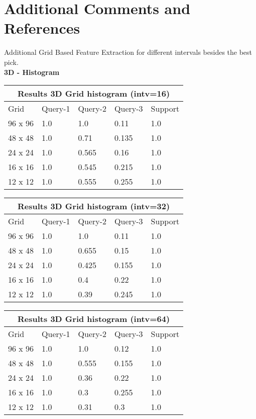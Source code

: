 \documentclass[12pt]{article}
\begin{document}
\section{Additional Comments and References}

Additional Grid Based Feature Extraction for different intervals besides the best pick. \\



\textbf{3D - Histogram} \\ 

\begin{tabular}{ |p{1.5cm}||p{2cm}|p{2cm}|p{2cm}|p{2cm}|  }
    \hline
    \multicolumn{5}{|c|}{Results 3D Grid histogram (intv=16)} \\
    \hline
    Grid & Query-1 & Query-2 & Query-3 & Support \\
    \hline
    96 x 96 & 1.0 & 1.0 & 0.11 & 1.0 \\
    \hline
    48 x 48 & 1.0 & 0.71 & 0.135 & 1.0 \\
    \hline
    24 x 24 & 1.0 & 0.565 & 0.16 & 1.0 \\
    \hline
    16 x 16 & 1.0 & 0.545 & 0.215 & 1.0 \\
    \hline
    12 x 12 & 1.0 & 0.555 & 0.255 & 1.0 \\
    \hline
\end{tabular}

\begin{tabular}{ |p{1.5cm}||p{2cm}|p{2cm}|p{2cm}|p{2cm}|  }
    \hline
    \multicolumn{5}{|c|}{Results 3D Grid histogram (intv=32)} \\
    \hline
    Grid & Query-1 & Query-2 & Query-3 & Support \\
    \hline
    96 x 96 & 1.0 & 1.0 & 0.11 & 1.0 \\
    \hline
    48 x 48 & 1.0 & 0.655 & 0.15 & 1.0 \\
    \hline
    24 x 24 & 1.0 & 0.425 & 0.155 & 1.0 \\
    \hline
    16 x 16 & 1.0 & 0.4 & 0.22 & 1.0 \\
    \hline
    12 x 12 & 1.0 & 0.39 & 0.245 & 1.0 \\
    \hline
\end{tabular}

\begin{tabular}{ |p{1.5cm}||p{2cm}|p{2cm}|p{2cm}|p{2cm}|  }
    \hline
    \multicolumn{5}{|c|}{Results 3D Grid histogram (intv=64)} \\
    \hline
    Grid & Query-1 & Query-2 & Query-3 & Support \\
    \hline
    96 x 96 & 1.0 & 1.0 & 0.12 & 1.0 \\
    \hline
    48 x 48 & 1.0 & 0.555 & 0.155 & 1.0 \\
    \hline
    24 x 24 & 1.0 & 0.36 & 0.22 & 1.0 \\
    \hline
    16 x 16 & 1.0 & 0.3 & 0.255 & 1.0 \\
    \hline
    12 x 12 & 1.0 & 0.31 & 0.3 & 1.0 \\
    \hline
\end{tabular}
\end{document}
